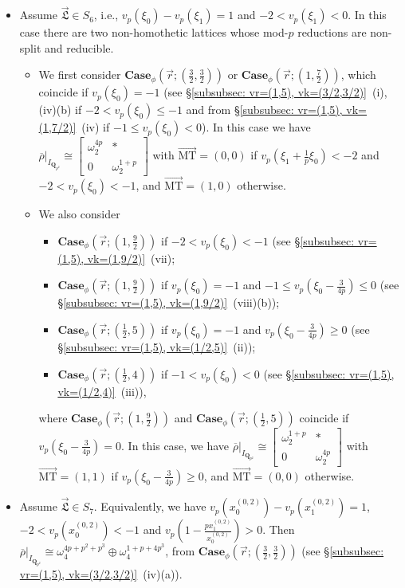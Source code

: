 \documentclass[11pt]{amsart}
\theoremstyle{definition}
\numberwithin{equation}{subsection}
\theoremstyle{plain}
\theoremstyle{plain}
\theoremstyle{plain}
\theoremstyle{plain}
\theoremstyle{plain}
\theoremstyle{plain}
\theoremstyle{plain}
\theoremstyle{plain}
\theoremstyle{plain}
\theoremstyle{plain}
\theoremstyle{plain}
\theoremstyle{plain}
\theoremstyle{definition}
\theoremstyle{definition}
\theoremstyle{definition}
\theoremstyle{remark}
\renewcommand{\(}{\textup{(}}
\renewcommand{\)}{\textup{)}}
\newcommand{\Q}{\mathbf{Q}}
\newcommand{\rhobar}{\overline{\rho}}
\newcommand{\fL}{\mathfrak{L}}
\newcommand{\vr}{\vec{r}}
\newcommand{\vL}{\vec{\fL}}
\newcommand{\IQptwo}{{I_{\Q_{p^2}}}}
\begin{document}
\begin{itemize}[leftmargin=*]
\item Assume $\vL\in S_6$, i.e., $v_p(\xi_0)-v_p(\xi_1)=1$ and $-2<v_p(\xi_1)<0$. In this case there are two non-homothetic lattices whose mod-$p$ reductions are non-split and reducible.
\begin{itemize}[leftmargin=*]
    \item We first consider $\mathbf{Case}_\phi(\vr;(\frac{3}{2},\frac{3}{2}))$ or $\mathbf{Case}_\phi(\vr;(1,\frac{7}{2}))$, which coincide if $v_p(\xi_0)=-1$ (see \S\ref{subsubsec: vr=(1,5), vk=(3/2,3/2)}~(i),(iv)(b) if $-2<v_p(\xi_0)\leq -1$ and from \S\ref{subsubsec: vr=(1,5), vk=(1,7/2)}~(iv) if $-1\leq v_p(\xi_0)<0$). In this case we have $\rhobar|_\IQptwo\cong
    \begin{bmatrix}
        \omega_2^{4p} & * \\ 0 & \omega_2^{1+p}
    \end{bmatrix}$ with $\vec{\mathrm{MT}}=(0,0)$ if $v_p(\xi_1+\frac{1}{p}\xi_0)<-2$ and $-2<v_p(\xi_0)<-1$, and $\vec{\mathrm{MT}}=(1,0)$ otherwise.
    \item We also consider
    \begin{itemize}[leftmargin=*]
        \item $\mathbf{Case}_\phi(\vr;(1,\frac{9}{2}))$ if $-2<v_p(\xi_0)<-1$ (see \S\ref{subsubsec: vr=(1,5), vk=(1,9/2)}~(vii);
        \item $\mathbf{Case}_\phi(\vr;(1,\frac{9}{2}))$ if $v_p(\xi_0)=-1$ and $-1\leq v_p(\xi_0-\frac{3}{4p})\leq 0$ (see \S\ref{subsubsec: vr=(1,5), vk=(1,9/2)}~(viii)(b));
        \item $\mathbf{Case}_\phi(\vr;(\frac{1}{2},5))$ if $v_p(\xi_0)=-1$ and $v_p(\xi_0-\frac{3}{4p})\geq 0$ (see \S\ref{subsubsec: vr=(1,5), vk=(1/2,5)}~(ii));
        \item $\mathbf{Case}_\phi(\vr;(\frac{1}{2},4))$ if $-1<v_p(\xi_0)<0$ (see \S\ref{subsubsec: vr=(1,5), vk=(1/2,4)}~(iii)),
    \end{itemize}
    where $\mathbf{Case}_\phi(\vr;(1,\frac{9}{2}))$ and $\mathbf{Case}_\phi(\vr;(\frac{1}{2},5))$ coincide if $v_p(\xi_0-\frac{3}{4p})=0$. In this case, we have $\rhobar|_\IQptwo\cong
    \begin{bmatrix}
        \omega_2^{1+p} & * \\ 0 & \omega_2^{4p}
    \end{bmatrix}$ with $\vec{\mathrm{MT}}=(1,1)$ if $v_p(\xi_0-\frac{3}{4p})\geq 0$, and $\vec{\mathrm{MT}}=(0,0)$ otherwise.
\end{itemize}

\item Assume $\vL\in S_7$. Equivalently, we have $v_p(x_0^{(0,2)})-v_p(x_1^{(0,2)})=1$, $-2<v_p(x_0^{(0,2)})<-1$ and $v_p(1-\frac{px_1^{(0,2)}}{x_0^{(0,2)}})>0$. Then $\rhobar|_\IQptwo\cong\omega_4^{4p+p^2+p^3}\oplus\omega_4^{1+p+4p^3}$, from $\mathbf{Case}_\phi(\vr;(\frac{3}{2},\frac{3}{2}))$ (see \S\ref{subsubsec: vr=(1,5), vk=(3/2,3/2)}~(iv)(a)).


\end{itemize}
\end{document}
